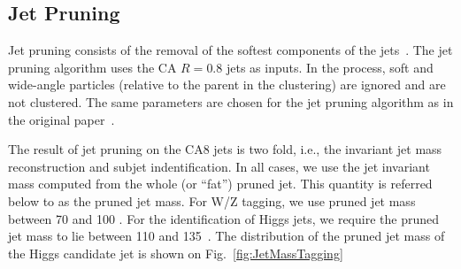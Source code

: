 




\subsection{Jet Pruning}
\label{sec:jetPruning}

Jet pruning consists of the removal of the softest
components of the jets~\cite{catop_cms,topwtag_pas}.
The jet pruning algorithm uses the CA $R=0.8$ jets as inputs. In the
process, soft and wide-angle particles (relative to the parent in the
clustering) are ignored and are not clustered.  
The same parameters are chosen for the jet
pruning algorithm as in the original paper~\cite{jetpruning1,jetpruning2}.



The result of jet pruning on the CA8 jets is two fold, i.e., the invariant jet mass 
reconstruction and subjet indentification.
In all cases,
we use the jet invariant mass computed from the whole (or ``fat'') 
pruned jet.  This quantity is referred below to as the pruned jet mass.
For W/Z tagging, we use pruned jet mass between 70 and 100 \GeVcc. 
For the identification of Higgs jets, we require the pruned jet mass to
lie between 110 and 135~\GeVcc.  The distribution of the pruned jet
mass of the Higgs candidate jet is shown on Fig.~\ref{fig:JetMassTagging} 


